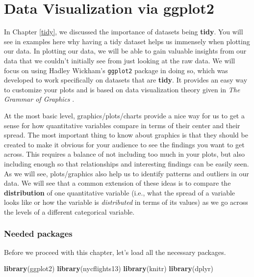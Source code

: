 \documentclass[]{tufte-book}
\newenvironment{Shaded}{\begin{snugshade}}{\end{snugshade}}
\newcommand{\KeywordTok}[1]{\textcolor[rgb]{0.13,0.29,0.53}{\textbf{{#1}}}}
\newcommand{\NormalTok}[1]{{#1}}
\begin{document}
\chapter{Data Visualization via ggplot2}\label{viz}

In Chapter \ref{tidy}, we discussed the importance of datasets being
\textbf{tidy}. You will see in examples here why having a tidy dataset
helps us immensely when plotting our data. In plotting our data, we will
be able to gain valuable insights from our data that we couldn't
initially see from just looking at the raw data. We will focus on using
Hadley Wickham's \texttt{ggplot2} package in doing so, which was
developed to work specifically on datasets that are \textbf{tidy}. It
provides an easy way to customize your plots and is based on data
visualization theory given in \emph{The Grammar of Graphics}
\citep{wilkinson2005}.

At the most basic level, graphics/plots/charts provide a nice way for us
to get a sense for how quantitative variables compare in terms of their
center and their spread. The most important thing to know about graphics
is that they should be created to make it obvious for your audience to
see the findings you want to get across. This requires a balance of not
including too much in your plots, but also including enough so that
relationships and interesting findings can be easily seen. As we will
see, plots/graphics also help us to identify patterns and outliers in
our data. We will see that a common extension of these ideas is to
compare the \textbf{distribution} of one quantitative variable (i.e.,
what the spread of a variable looks like or how the variable is
\emph{distributed} in terms of its values) as we go across the levels of
a different categorical variable.

\subsection*{Needed packages}\label{needed-packages-1}

Before we proceed with this chapter, let's load all the necessary
packages.

\begin{Shaded}
\begin{Highlighting}[]
\KeywordTok{library}\NormalTok{(ggplot2)}
\KeywordTok{library}\NormalTok{(nycflights13)}
\KeywordTok{library}\NormalTok{(knitr)}
\KeywordTok{library}\NormalTok{(dplyr)}
\end{Highlighting}
\end{Shaded}
\end{document}
